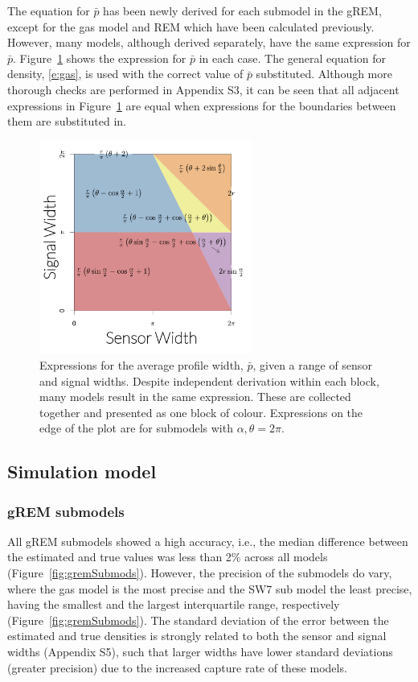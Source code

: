 The equation for $\bar{p}$ has been newly derived for each submodel in the gREM, except for the gas model and REM which have been calculated previously.
However, many models, although derived separately, have the same expression for $\bar{p}$.
Figure~\ref{f:equalModelResults} shows the expression for $\bar{p}$ in each case.
The general equation for density, \ref{e:gas}, is used with the correct value of $\bar{p}$ substituted.
Although more thorough checks are performed in Appendix S3, it can be seen that all adjacent expressions in Figure~\ref{f:equalModelResults} are equal when expressions for the boundaries between them are substituted in.






\begin{figure}
	\centering
	\includegraphics[width=7cm]{imgs/equalRegionsExpressions.pdf}
	\caption[Expressions for the average profile width]{
Expressions for the average profile width, $\bar{p}$, given a range of sensor and signal widths.
Despite independent derivation within each block, many models result in the same expression.
These are collected together and presented as one block of colour.
Expressions on the edge of the plot are for submodels with $\alpha, \theta = 2\pi$. }
	\label{f:equalModelResults}
\end{figure}


\subsection{Simulation model}

\subsubsection{gREM submodels}
All gREM submodels showed a high accuracy, i.e., the median difference between the estimated and true values was less than 2\% across all models (Figure~\ref{fig:gremSubmods}).
However, the precision of the submodels do vary, where the gas model is the most precise and the SW7 sub model the least precise, having the smallest and the largest interquartile range, respectively (Figure~\ref{fig:gremSubmods}).
The standard deviation of the error between the estimated and true densities is strongly related to both the sensor and signal widths (Appendix S5), such that larger widths have lower standard deviations (greater precision) due to the increased capture rate of these models.



